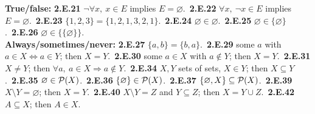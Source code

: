 \begin{trybox}[{2.E.21--2.E.27, 2.E.29--2.E.31, 2.E.34--2.E.37, 2.E.39, 2.E.40, 2.E.42 \fO}]
\textbf{True/false:} \textbf{2.E.21} $\neg\forall x,\ x\in E$ implies $E=\varnothing$.\ \textbf{2.E.22} $\forall x,\ \neg x\in E$ implies $E=\varnothing$.\ \textbf{2.E.23} $\{1,2,3\}=\{1,2,1,3,2,1\}$.\ \textbf{2.E.24} $\varnothing\in\varnothing$.\ \textbf{2.E.25} $\varnothing\in\{\varnothing\}$.\ \textbf{2.E.26} $\varnothing\in\{\{\varnothing\}\}$.\\
\textbf{Always/sometimes/never:} \textbf{2.E.27} $\{a,b\}=\{b,a\}$.\ \textbf{2.E.29} some $a$ with $a\in X\Leftrightarrow a\in Y$; then $X=Y$.\ \textbf{2.E.30} some $a\in X$ with $a\notin Y$; then $X=Y$.\ \textbf{2.E.31} $X\ne Y$; then $\forall a,\ a\in X\Rightarrow a\notin Y$.\ \textbf{2.E.34} $X,Y$ sets of sets, $X\in Y$; then $X\subseteq Y$.\ \textbf{2.E.35} $\varnothing\in\mathcal{P}(X)$.\ \textbf{2.E.36} $\{\varnothing\}\in\mathcal{P}(X)$.\ \textbf{2.E.37} $\{\varnothing,X\}\subseteq\mathcal{P}(X)$.\ \textbf{2.E.39} $X\setminus Y=\varnothing$; then $X=Y$.\ \textbf{2.E.40} $X\setminus Y=Z$ and $Y\subseteq Z$; then $X=Y\cup Z$.\ \textbf{2.E.42} $A\subseteq X$; then $A\in X$.
\end{trybox}
